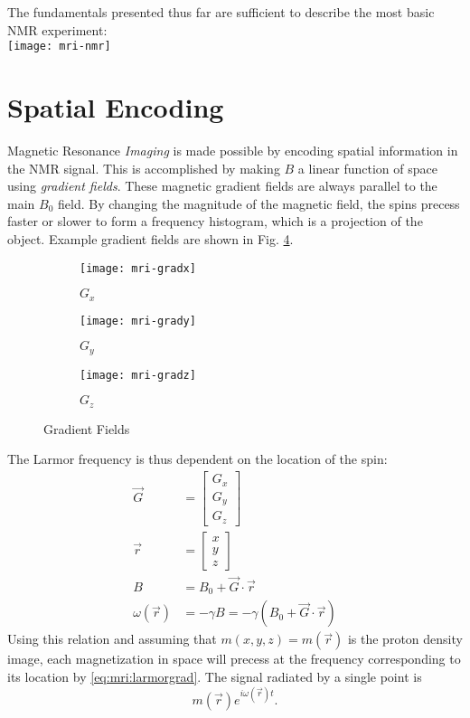 The fundamentals presented thus far are sufficient to describe the most basic NMR experiment:\\
{\centering
	\texttt{[image: mri-nmr]}
}

\section{Spatial Encoding}
Magnetic Resonance \textit{Imaging} is made possible by encoding spatial information in the NMR signal. This is accomplished by making $B$ a linear function of space using \textit{gradient fields}. These magnetic gradient fields are always parallel to the main $B_0$ field. By changing the magnitude of the magnetic field, the spins precess faster or slower to form a frequency histogram, which is a projection of the object. Example gradient fields are shown in Fig. \ref{fig:mri:gradients}.

\begin{figure}[ht]
	\centering
	\begin{subfigure}[b]{0.3\textwidth}
		\centering
		\texttt{[image: mri-gradx]}
		\caption{$G_x$}
		\label{fig:mri:gradx}
	\end{subfigure}\hfill
	\begin{subfigure}[b]{0.3\textwidth}
		\centering
		\texttt{[image: mri-grady]}
		\caption{$G_y$}
		\label{fig:mri:grady}
	\end{subfigure}\hfill
	\begin{subfigure}[b]{0.3\textwidth}
		\centering
		\texttt{[image: mri-gradz]}
		\caption{$G_z$}
		\label{fig:mri:gradz}
	\end{subfigure}
	\caption{Gradient Fields}\label{fig:mri:gradients}
\end{figure} 

The Larmor frequency is thus dependent on the location of the spin:
\begin{align}
\vec{G} &= \left[\begin{matrix}G_x\\G_y\\G_z\end{matrix}\right]\\
\vec{r} &= \left[\begin{matrix}x\\y\\z\end{matrix}\right]\\
B &= B_0 + \vec{G}\cdot \vec{r}\\
\omega(\vec{r}) &= -\gamma B = -\gamma\left(B_0 + \vec{G}\cdot \vec{r}\right) \label{eq:mri:larmorgrad}
\end{align}
Using this relation and assuming that $m(x,y,z) = m(\vec{r})$ is the proton density image, each magnetization in space will precess at the frequency corresponding to its location by \ref{eq:mri:larmorgrad}. The signal radiated by a single point is 
\begin{equation}
m(\vec{r})e^{i\omega(\vec{r})t}.
\end{equation}

